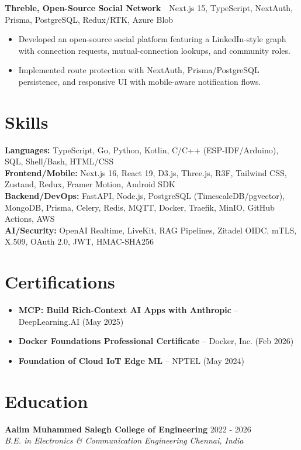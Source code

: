 \documentclass[10pt, letterpaper]{article}
\newcommand{\resumeEntry}[4]{
  \noindent\textbf{#1} \hfill #3 \\[-2pt]
  \textit{#2} \hfill \textit{#4}
}
\newcommand{\resumeProject}[2]{
  \noindent\textbf{#1}\ {\small\textperiodcentered\ #2}
}
\begin{document}
\vspace{1pt}
\resumeProject{Threble, Open-Source Social Network}{Next.js 15, TypeScript, NextAuth, Prisma, PostgreSQL, Redux/RTK, Azure Blob}
\begin{itemize}
  \item Developed an open-source social platform featuring a LinkedIn-style graph with connection requests, mutual-connection lookups, and community roles.
  \item Implemented route protection with NextAuth, Prisma/PostgreSQL persistence, and responsive UI with mobile-aware notification flows.
\end{itemize}

\vspace{1pt}

\section{Skills}
\noindent\textbf{Languages:} TypeScript, Go, Python, Kotlin, C/C++ (ESP-IDF/Arduino), SQL, Shell/Bash, HTML/CSS \\
\textbf{Frontend/Mobile:} Next.js 16, React 19, D3.js, Three.js, R3F, Tailwind CSS, Zustand, Redux, Framer Motion, Android SDK \\
\textbf{Backend/DevOps:} FastAPI, Node.js, PostgreSQL (TimescaleDB/pgvector), MongoDB, Prisma, Celery, Redis, MQTT, Docker, Traefik, MinIO, GitHub Actions, AWS \\
\textbf{AI/Security:} OpenAI Realtime, LiveKit, RAG Pipelines, Zitadel OIDC, mTLS, X.509, OAuth 2.0, JWT, HMAC-SHA256

\vspace{1pt}

\section{Certifications}
\begin{itemize}
  \item \textbf{MCP: Build Rich-Context AI Apps with Anthropic} -- DeepLearning.AI (May 2025)
  \item \textbf{Docker Foundations Professional Certificate} -- Docker, Inc. (Feb 2026)
  \item \textbf{Foundation of Cloud IoT Edge ML} -- NPTEL (May 2024)
\end{itemize}

\vspace{1pt}

\section{Education}
\resumeEntry{Aalim Muhammed Salegh College of Engineering}{B.E. in Electronics \& Communication Engineering}{2022 - 2026}{Chennai, India}
\end{document}
